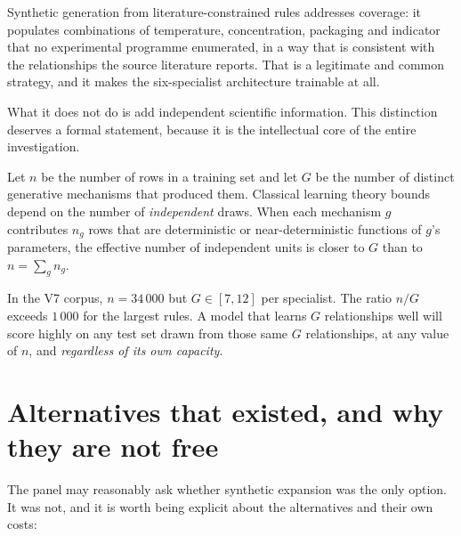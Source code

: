 Synthetic generation from literature-constrained rules addresses coverage:
it populates combinations of temperature, concentration, packaging and
indicator that no experimental programme enumerated, in a way that is
consistent with the relationships the source literature reports. That is a
legitimate and common strategy, and it makes the six-specialist
architecture trainable at all.

What it does not do is add independent scientific information. This
distinction deserves a formal statement, because it is the intellectual
core of the entire investigation.

\begin{findingbox}[title=Sample size is not information]
Let $n$ be the number of rows in a training set and let $G$ be the number
of distinct generative mechanisms that produced them. Classical learning
theory bounds depend on the number of \emph{independent} draws. When each
mechanism $g$ contributes $n_g$ rows that are deterministic or
near-deterministic functions of $g$'s parameters, the effective number of
independent units is closer to $G$ than to $n = \sum_g n_g$.

In the V7 corpus, $n = 34\,000$ but $G \in [7, 12]$ per specialist. The
ratio $n/G$ exceeds $1\,000$ for the largest rules. A model that learns
$G$ relationships well will score highly on any test set drawn from those
same $G$ relationships, at any value of $n$, and \emph{regardless of its
own capacity}.
\end{findingbox}



\section{Alternatives that existed, and why they are not free}

The panel may reasonably ask whether synthetic expansion was the only
option. It was not, and it is worth being explicit about the alternatives
and their own costs:

